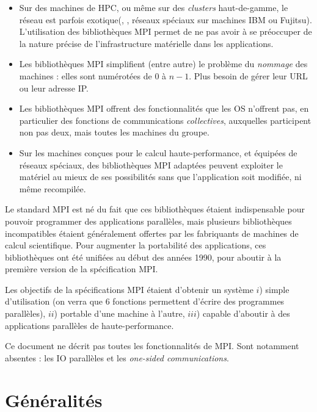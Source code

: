 \begin{itemize}
\item Sur des machines de HPC, ou même sur des \emph{clusters} haut-de-gamme, le
  réseau est parfois \og exotique\fg (, ,
  réseaux spéciaux sur machines IBM ou Fujitsu). L'utilisation des bibliothèques
  MPI permet de ne pas avoir à se préoccuper de la nature précise de
  l'infrastructure matérielle dans les applications.

\item Les bibliothèques MPI simplifient (entre autre) le problème du
  \emph{nommage} des machines : elles sont numérotées de $0$ à $n-1$. Plus
  besoin de gérer leur URL ou leur adresse IP.

\item Les bibliothèques MPI offrent des fonctionnalités que les OS n'offrent
  pas, en particulier des fonctions de communications \emph{collectives},
  auxquelles participent non pas deux, mais toutes les machines du groupe.

\item Sur les machines conçues pour le calcul haute-performance, et
  équipées de réseaux spéciaux, des bibliothèques MPI adaptées peuvent
  exploiter le matériel au mieux de ses possibilités sans que
  l'application soit modifiée, ni même recompilée.
\end{itemize}

Le standard MPI est né du fait que ces bibliothèques étaient
indispensable pour pouvoir programmer des applications parallèles,
mais plusieurs bibliothèques incompatibles étaient généralement offertes
par les fabriquants de machines de calcul scientifique. Pour augmenter
la portabilité des applications, ces bibliothèques ont été unifiées au
début des années 1990, pour aboutir à la première version de la
spécification MPI.

Les objectifs de la spécifications MPI étaient d'obtenir un système $i$) simple
d'utilisation (on verra que 6 fonctions permettent d'écrire des programmes
parallèles), $ii$) portable d'une machine à l'autre, $iii$) capable d'aboutir à
des applications parallèles de haute-performance.

Ce document ne décrit pas toutes les fonctionnalités de MPI. Sont notamment
absentes : les IO parallèles et les \og \emph{one-sided communications}\fg.

\section{Généralités}

